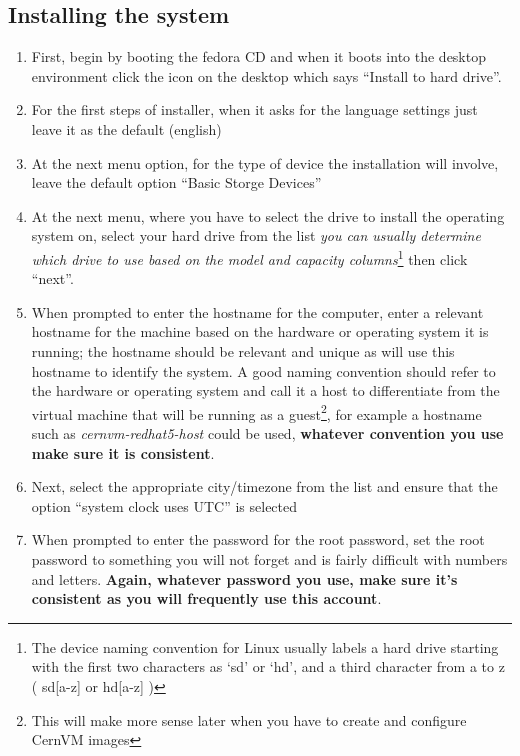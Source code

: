 \subsection{Installing the system}
\label{sec:rhinstall}
\flushleft
\begin{enumerate}
\item First, begin by booting the fedora CD and when it boots into the desktop environment click the icon on the desktop which says
	  ``Install to hard drive''.
	  
\item	For the first steps of installer, when it asks for the language settings just leave it as the default (english)

\item 	At the next menu option, for the type of device the installation will involve, leave the default option ``Basic Storge Devices''

\item 	At the next menu, where you have to select the drive to install the operating system on, select your hard drive from the list
	  	\emph{you can usually determine which drive to use based on the model and capacity columns}\footnote{ The device naming convention
	  	for Linux usually labels a hard drive starting with the first two characters as `sd' or `hd', and a third character from a to z 
	  	( sd[a-z] or hd[a-z] )} then click ``next''.
	  
\item 	When prompted to enter the hostname for the computer, enter a relevant hostname for the machine based on the hardware or operating
		system it is running; the hostname should be relevant and unique as \tapper will use this hostname to identify the system. A good naming
		convention should refer to the hardware or operating system and call it a host to differentiate from the virtual machine that will be
		running as a guest\footnote{This will make more sense later when you have to create and configure CernVM images}, for example a hostname such
		as \emph{cernvm-redhat5-host} could be used, {\bf whatever convention you use make sure it is consistent}.
		
\item	Next, select the appropriate city/timezone from the list and ensure that the option ``system clock uses UTC'' is selected

\item	When prompted to enter the password for the root password, set the root password to something you will not forget and is fairly
		difficult with numbers and letters. {\bf Again, whatever password you use,  make sure it's consistent as you will frequently
		use this account}.
		

\end{enumerate}
